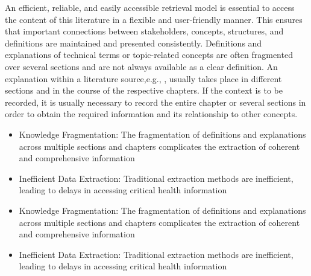 An efficient, reliable, and easily accessible retrieval model is essential to access the content of this literature in a flexible and user-friendly manner. 
This ensures that important connections between stakeholders, concepts, structures, and definitions are maintained and presented consistently. 
Definitions and explanations of technical terms or topic-related concepts are often fragmented over several sections and are not always available as a clear definition. 
An explanation within a literature source,e.g., \citet{bb2}, usually takes place in different sections and in the course of the respective chapters.
If the context is to be recorded, it is usually necessary to record the entire chapter or several sections in order to obtain the required information and its relationship to other concepts. 
\begin{itemize}
\item Knowledge Fragmentation: The fragmentation of definitions and explanations across multiple sections and chapters complicates the extraction of coherent and comprehensive information
\item Inefficient Data Extraction: Traditional extraction methods are inefficient, leading to delays in accessing critical health information
%
\end{itemize}
\begin{itemize}
\item Knowledge Fragmentation: The fragmentation of definitions and explanations across multiple sections and chapters complicates the extraction of coherent and comprehensive information
\item Inefficient Data Extraction: Traditional extraction methods are inefficient, leading to delays in accessing critical health information

\end{itemize}
